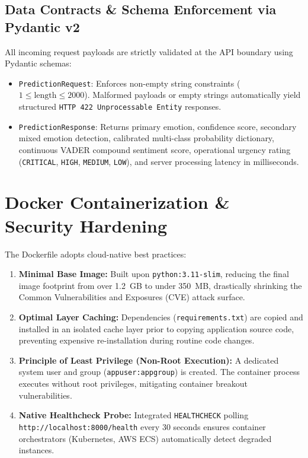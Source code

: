 \documentclass[11pt, a4paper]{article}
\begin{document}
\subsection{Data Contracts \& Schema Enforcement via Pydantic v2}
All incoming request payloads are strictly validated at the API boundary using Pydantic schemas:
\begin{itemize}[leftmargin=1.5em]
    \item \texttt{PredictionRequest}: Enforces non-empty string constraints ($1 \le \text{length} \le 2000$). Malformed payloads or empty strings automatically yield structured \texttt{HTTP 422 Unprocessable Entity} responses.
    \item \texttt{PredictionResponse}: Returns primary emotion, confidence score, secondary mixed emotion detection, calibrated multi-class probability dictionary, continuous VADER compound sentiment score, operational urgency rating (\texttt{CRITICAL}, \texttt{HIGH}, \texttt{MEDIUM}, \texttt{LOW}), and server processing latency in milliseconds.
\end{itemize}

\section{Docker Containerization \& Security Hardening}
The Dockerfile adopts cloud-native best practices:
\begin{enumerate}[leftmargin=1.5em]
    \item \textbf{Minimal Base Image:} Built upon \texttt{python:3.11-slim}, reducing the final image footprint from over 1.2~GB to under 350~MB, drastically shrinking the Common Vulnerabilities and Exposures (CVE) attack surface.
    \item \textbf{Optimal Layer Caching:} Dependencies (\texttt{requirements.txt}) are copied and installed in an isolated cache layer prior to copying application source code, preventing expensive re-installation during routine code changes.
    \item \textbf{Principle of Least Privilege (Non-Root Execution):} A dedicated system user and group (\texttt{appuser:appgroup}) is created. The container process executes without root privileges, mitigating container breakout vulnerabilities.
    \item \textbf{Native Healthcheck Probe:} Integrated \texttt{HEALTHCHECK} polling \texttt{http://localhost:8000/health} every 30 seconds ensures container orchestrators (Kubernetes, AWS ECS) automatically detect degraded instances.
\end{enumerate}
\end{document}
